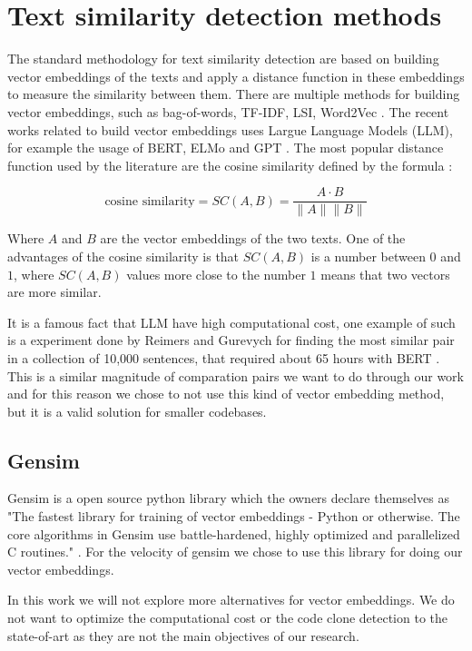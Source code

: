 \en

\section{Text similarity detection methods}

The standard methodology for text similarity detection are based on building vector embeddings of
the texts and apply a distance function in these embeddings to measure the similarity between them. 
There are multiple methods for building vector embeddings, such as bag-of-words, TF-IDF, LSI, Word2Vec \citep{gensimlivro}. 
The recent works related to build vector embeddings uses Largue Language Models (LLM), for example the usage of BERT, ELMo 
and GPT \citep{llmsimilar}. The most popular distance function used by the literature are the cosine similarity 
defined by the formula \citep{cosineref}:

$$\text{cosine similarity} = SC(A,B) = \frac{ A \cdot B}{ \lVert A \rVert \lVert B \rVert }$$


Where $A$ and $B$ are the vector embeddings of the two texts. One of the advantages of the cosine similarity is that $SC(A,B)$ 
is a number between $0$ and $1$, where $SC(A,B)$ values more close to the number $1$ means that two vectors are more similar. 

It is a famous fact that LLM have high computational cost, one example of such is a experiment done by Reimers and Gurevych for 
finding the most similar pair in a collection of 10,000 sentences, that required about 65 hours with BERT \citep{bertsimilar}. This 
is a similar magnitude of comparation pairs we want to do through our work and for this reason we chose to not use this kind of 
vector embedding method, but it is a valid solution for smaller codebases.

\subsection{Gensim}

Gensim is a open source python library \citep{gensim} which the owners declare themselves as "The fastest library 
for training of vector embeddings - Python or otherwise. The core algorithms in Gensim use battle-hardened, 
highly optimized and parallelized C routines." \citep{gensimsite}. For the velocity of gensim we chose to use this library
for doing our vector embeddings. 

In this work we will not explore more alternatives for vector embeddings. We do not want to optimize the computational 
cost or the code clone detection to the state-of-art as they are not the main objectives of our research.


